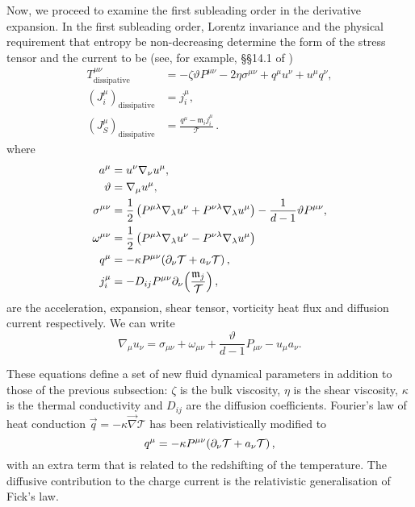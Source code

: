 \documentclass[12pt]{article}
\newcommand{\tloc}{\mathcal{T}}
\newcommand{\ml}{\mathfrak{m}}
\begin{document}
Now, we proceed to examine the first subleading order in the derivative expansion. In the first subleading order, Lorentz invariance and the physical requirement that entropy be non-decreasing determine the form of the stress tensor and the current to be (see, for example, \S\S14.1 of \cite{Andersson:2006nr})
%
\begin{equation}\label{extraTvisc:eq}
\begin{split}
  T^{\mu\nu}_\mathrm{dissipative} &= -\zeta \vartheta P^{\mu\nu} -
  2\eta\sigma^{\mu\nu} + q^\mu u^\nu + u^\mu q^\nu,\\
 (J^\mu_i)_\mathrm{dissipative} &= j^\mu_{i},\\
(J^\mu_S)_\mathrm{dissipative} &= \frac{q^\mu-\ml_i j^\mu_{i}}{\tloc}\,.
\end{split}
\end{equation}
%
where
%
\begin{equation}\label{fluidtensors:eq}
\begin{split}
  a^\mu &= u^\nu \nabla_\nu u^\mu, \\
  \vartheta &= \nabla_\mu u^\mu, \\
  \sigma^{\mu\nu} &= \half \prn{P^{\mu\lambda} \nabla_\lambda u^\nu
                   + P^{\nu\lambda} \nabla_\lambda u^\mu}
                   - \frac{1}{d-1} \vartheta P^{\mu\nu}, \\
  \omega^{\mu\nu} &= \half \prn{P^{\mu\lambda} \nabla_\lambda u^\nu
                   - P^{\nu\lambda} \nabla_\lambda u^\mu} \\
 q^\mu &= -\kappa P^{\mu\nu} (\p_\nu\tloc + a_\nu\tloc)\,, \\
 j^\mu_{i}
   & = - D_{ij} P^{\mu\nu}\p_\nu\! \prn{\frac{\ml_j}{\tloc}},
\end{split}
\end{equation}
%
are the acceleration, expansion, shear tensor, vorticity
heat flux and diffusion current respectively.
We can write
%
\begin{equation}\label{velder:eq}
  \nabla_\mu u_\nu = \sigma_{\mu\nu}+\omega_{\mu\nu}+\frac{\vartheta}{d-1}P_{\mu\nu}-u_\mu a_\nu.
\end{equation}
%


These equations define a set of new fluid dynamical parameters in addition to those of the previous subsection: $\zeta$ is the bulk viscosity, $\eta$ is the shear viscosity, $\kappa$ is the thermal conductivity and $D_{ij}$ are the diffusion coefficients. Fourier's law of heat conduction $\vec{q} = -\kappa \vec{\nabla} \tloc$ has been relativistically modified to
%
\begin{equation}\label{heatcond:eq}
  q^\mu = -\kappa P^{\mu\nu} (\p_\nu\tloc + a_\nu\tloc)\,,
\end{equation}
%
with an extra term that is related to the redshifting of the temperature. The diffusive contribution to the charge current is the relativistic generalisation of Fick's law.
\end{document}
